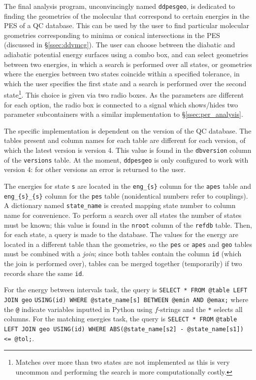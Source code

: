\documentclass[12pt]{article}
\begin{document}
The final analysis program, unconvincingly named \texttt{ddpesgeo}, is dedicated to finding the geometries of the molecular that correspond to certain energies in the PES of a QC database. This can be used by the user to find particular molecular geometries corresponding to minima or conical intersections in the PES (discussed in \S\ref{ssec:ddvmcg}). The user can choose between the diabatic and adiabatic potential energy surfaces using a combo box, and can select geometries between two energies, in which a search is performed over all states, or geometries where the energies between two states coincide within a specified tolerance, in which the user specifies the first state and a search is performed over the second state\footnote{Matches over more than two states are not implemented as this is very uncommon and performing the search is more computationally costly.}. This choice is given via two radio boxes. As the parameters are different for each option, the radio box is connected to a signal which shows/hides two parameter subcontainers with a similar implementation to \S\ref{ssec:per_analysis}.

The specific implementation is dependent on the version of the QC database. The tables present and column names for each table are different for each version, of which the latest version is version 4. This value is found in the \texttt{dbversion} column of the \texttt{versions} table. At the moment, \texttt{ddpesgeo} is only configured to work with version 4: for other versions an error is returned to the user.

The energies for state \texttt{s} are located in the \texttt{eng\_\{s\}} column for the \texttt{apes} table and \texttt{eng\_\{s\}\_\{s\}} column for the \texttt{pes} table (nonidentical numbers refer to couplings). A dictionary named \texttt{state\_name} is created mapping state number to column name for convenience. To perform a search over all states the number of states must be known; this value is found in the \texttt{nroot} column of the \texttt{refdb} table. Then, for each state, a query is made to the database. The values for the energy are located in a different table than the geometries, so the \texttt{pes} or \texttt{apes} and \texttt{geo} tables must be combined with a \textit{join}; since both tables contain the column \texttt{id} (which the join is performed over), tables can be merged together (temporarily) if two records share the same \texttt{id}.

For the energy between intervals task, the query is \texttt{SELECT * FROM @table LEFT JOIN geo} \texttt{USING(id) WHERE @state_name[s] BETWEEN @emin AND @emax;} where the \texttt{@} indicate variables inputted in Python using \(f\)-strings and the \texttt{*} selects all columns. For the matching energies task, the query is \texttt{SELECT * FROM} \texttt{@table LEFT JOIN geo USING(id) WHERE ABS(@state_name[s2] - @state_name[s1]) <= @tol;}.
\end{document}
